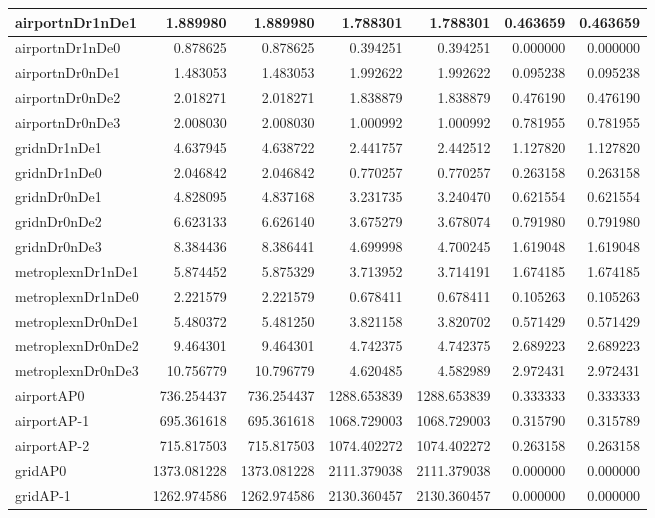 \begin{longtable}{|l|r|r|r|r|r|r|}
\endlastfoot
airportnDr1nDe1 & 1.889980 & 1.889980 & 1.788301 & 1.788301 & 0.463659 & 0.463659 \\ \hline
airportnDr1nDe0 & 0.878625 & 0.878625 & 0.394251 & 0.394251 & 0.000000 & 0.000000 \\ \hline
airportnDr0nDe1 & 1.483053 & 1.483053 & 1.992622 & 1.992622 & 0.095238 & 0.095238 \\ \hline
airportnDr0nDe2 & 2.018271 & 2.018271 & 1.838879 & 1.838879 & 0.476190 & 0.476190 \\ \hline
airportnDr0nDe3 & 2.008030 & 2.008030 & 1.000992 & 1.000992 & 0.781955 & 0.781955 \\ \hline
gridnDr1nDe1 & 4.637945 & 4.638722 & 2.441757 & 2.442512 & 1.127820 & 1.127820 \\ \hline
gridnDr1nDe0 & 2.046842 & 2.046842 & 0.770257 & 0.770257 & 0.263158 & 0.263158 \\ \hline
gridnDr0nDe1 & 4.828095 & 4.837168 & 3.231735 & 3.240470 & 0.621554 & 0.621554 \\ \hline
gridnDr0nDe2 & 6.623133 & 6.626140 & 3.675279 & 3.678074 & 0.791980 & 0.791980 \\ \hline
gridnDr0nDe3 & 8.384436 & 8.386441 & 4.699998 & 4.700245 & 1.619048 & 1.619048 \\ \hline
metroplexnDr1nDe1 & 5.874452 & 5.875329 & 3.713952 & 3.714191 & 1.674185 & 1.674185 \\ \hline
metroplexnDr1nDe0 & 2.221579 & 2.221579 & 0.678411 & 0.678411 & 0.105263 & 0.105263 \\ \hline
metroplexnDr0nDe1 & 5.480372 & 5.481250 & 3.821158 & 3.820702 & 0.571429 & 0.571429 \\ \hline
metroplexnDr0nDe2 & 9.464301 & 9.464301 & 4.742375 & 4.742375 & 2.689223 & 2.689223 \\ \hline
metroplexnDr0nDe3 & 10.756779 & 10.796779 & 4.620485 & 4.582989 & 2.972431 & 2.972431 \\ \hline
airportAP0 & 736.254437 & 736.254437 & 1288.653839 & 1288.653839 & 0.333333 & 0.333333 \\ \hline
airportAP-1 & 695.361618 & 695.361618 & 1068.729003 & 1068.729003 & 0.315790 & 0.315789 \\ \hline
airportAP-2 & 715.817503 & 715.817503 & 1074.402272 & 1074.402272 & 0.263158 & 0.263158 \\ \hline
gridAP0 & 1373.081228 & 1373.081228 & 2111.379038 & 2111.379038 & 0.000000 & 0.000000 \\ \hline
gridAP-1 & 1262.974586 & 1262.974586 & 2130.360457 & 2130.360457 & 0.000000 & 0.000000 \\ \hline

\end{longtable}

